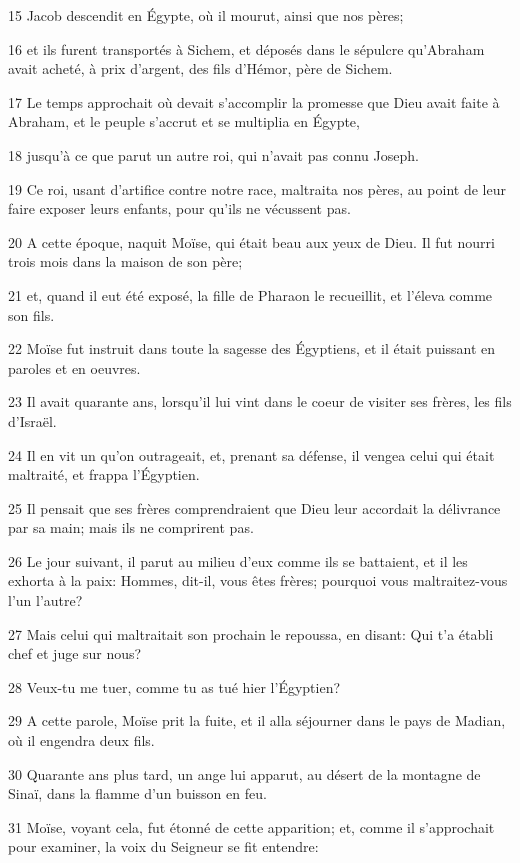 \par 15 Jacob descendit en Égypte, où il mourut, ainsi que nos pères;
\par 16 et ils furent transportés à Sichem, et déposés dans le sépulcre qu'Abraham avait acheté, à prix d'argent, des fils d'Hémor, père de Sichem.
\par 17 Le temps approchait où devait s'accomplir la promesse que Dieu avait faite à Abraham, et le peuple s'accrut et se multiplia en Égypte,
\par 18 jusqu'à ce que parut un autre roi, qui n'avait pas connu Joseph.
\par 19 Ce roi, usant d'artifice contre notre race, maltraita nos pères, au point de leur faire exposer leurs enfants, pour qu'ils ne vécussent pas.
\par 20 A cette époque, naquit Moïse, qui était beau aux yeux de Dieu. Il fut nourri trois mois dans la maison de son père;
\par 21 et, quand il eut été exposé, la fille de Pharaon le recueillit, et l'éleva comme son fils.
\par 22 Moïse fut instruit dans toute la sagesse des Égyptiens, et il était puissant en paroles et en oeuvres.
\par 23 Il avait quarante ans, lorsqu'il lui vint dans le coeur de visiter ses frères, les fils d'Israël.
\par 24 Il en vit un qu'on outrageait, et, prenant sa défense, il vengea celui qui était maltraité, et frappa l'Égyptien.
\par 25 Il pensait que ses frères comprendraient que Dieu leur accordait la délivrance par sa main; mais ils ne comprirent pas.
\par 26 Le jour suivant, il parut au milieu d'eux comme ils se battaient, et il les exhorta à la paix: Hommes, dit-il, vous êtes frères; pourquoi vous maltraitez-vous l'un l'autre?
\par 27 Mais celui qui maltraitait son prochain le repoussa, en disant: Qui t'a établi chef et juge sur nous?
\par 28 Veux-tu me tuer, comme tu as tué hier l'Égyptien?
\par 29 A cette parole, Moïse prit la fuite, et il alla séjourner dans le pays de Madian, où il engendra deux fils.
\par 30 Quarante ans plus tard, un ange lui apparut, au désert de la montagne de Sinaï, dans la flamme d'un buisson en feu.
\par 31 Moïse, voyant cela, fut étonné de cette apparition; et, comme il s'approchait pour examiner, la voix du Seigneur se fit entendre:
